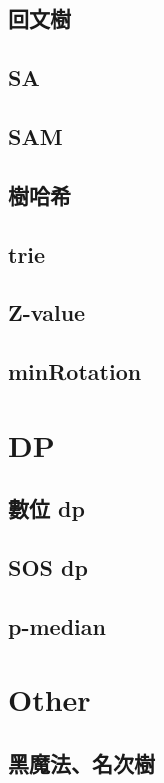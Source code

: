 \documentclass[a4paper,10pt,twocolumn,oneside]{article}
\begin{document}
\subsection{回文樹}

\subsection{SA}

\subsection{SAM}

\subsection{樹哈希}

\subsection{trie}

\subsection{Z-value}

\subsection{minRotation}

\section{DP}
\subsection{數位 dp}

\subsection{SOS dp}

\subsection{p-median}

\section{Other}
\subsection{黑魔法、名次樹}

%
\end{document}
